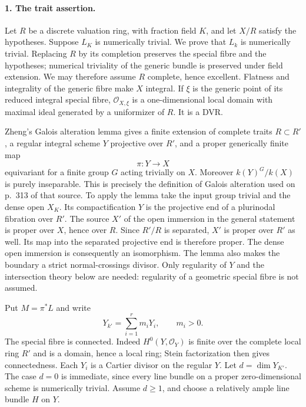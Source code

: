 \paragraph{1. The trait assertion.}
Let $R$ be a discrete valuation ring, with fraction field $K$, and let
$X/R$ satisfy the hypotheses. Suppose $L_K$ is numerically trivial.
We prove that $L_k$ is numerically trivial. Replacing $R$ by its completion
preserves the special fibre and the hypotheses; numerical triviality of
the generic bundle is preserved under field extension. We may therefore
assume $R$ complete, hence excellent. Flatness and integrality of the generic
fibre make $X$ integral. If $\xi$ is the generic point of its reduced
integral special fibre, $\mathcal O_{X,\xi}$ is a one-dimensional local
domain with maximal ideal generated by a uniformizer of $R$. It is a DVR.

Zheng's Galois alteration lemma
\cite[Lemma~3.8, pp.~313--314]{BCEZheng2009} gives a finite extension of
complete traits $R\subset R'$, a regular integral scheme $Y$ projective
over $R'$, and a proper generically finite map
\[
 \pi:Y\longrightarrow X
\]
equivariant for a finite group $G$ acting trivially on $X$. Moreover
$k(Y)^G/k(X)$ is purely inseparable. This is precisely the definition of
Galois alteration used on p.~313 of that source. To apply the lemma take
the input group trivial and the dense open $X_K$. Its compactification
$Y$ is the projective end of a plurinodal fibration over $R'$. The source
$X'$ of the open immersion in the general statement is proper over $X$,
hence over $R$. Since $R'/R$ is separated, $X'$ is proper over $R'$ as
well. Its map into the separated projective end is therefore proper.
The dense open immersion is consequently an isomorphism. The lemma also makes the
boundary a strict normal-crossings divisor. Only regularity of $Y$ and
the intersection theory below are needed: regularity of a geometric
special fibre is not assumed.

Put $M=\pi^*L$ and write
\[
 Y_{k'}=\sum_{i=1}^r m_iY_i,\qquad m_i>0.                \tag{E4.T.2}
\]
The special fibre is connected. Indeed $H^0(Y,\mathcal O_Y)$ is finite
over the complete local ring $R'$ and is a domain, hence a local ring;
Stein factorization then gives connectedness. Each $Y_i$ is a Cartier
divisor on the regular $Y$. Let $d=\dim Y_{K'}$. The case $d=0$ is
immediate, since every line bundle on a proper zero-dimensional scheme
is numerically trivial. Assume $d\geq1$, and choose a relatively ample
line bundle $H$ on $Y$.

